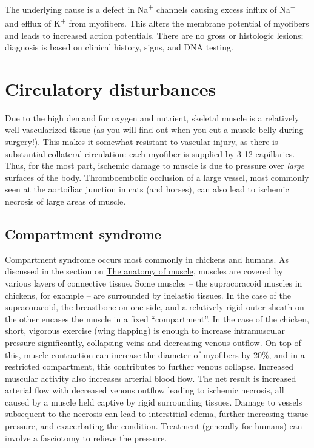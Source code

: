 \documentclass[openany]{book}
\begin{document}
The underlying cause is a defect in Na\textsuperscript{+} channels
causing excess influx of Na\textsuperscript{+} and efflux of
K\textsuperscript{+} from myofibers. This alters the membrane potential
of myofibers and leads to increased action potentials. There are no
gross or histologic lesions; diagnosis is based on clinical history,
signs, and DNA testing.

\chapter{Circulatory disturbances}\label{circulatory-disturbances}

Due to the high demand for oxygen and nutrient, skeletal muscle is a
relatively well vascularized tissue (as you will find out when you cut a
muscle belly during surgery!). This makes it somewhat resistant to
vascular injury, as there is substantial collateral circulation: each
myofiber is supplied by 3-12 capillaries. Thus, for the most part,
ischemic damage to muscle is due to pressure over \emph{large} surfaces
of the body. Thromboembolic occlusion of a large vessel, most commonly
seen at the aortoiliac junction in cats (and horses), can also lead to
ischemic necrosis of large areas of muscle.

\section{Compartment syndrome}\label{compartment-syndrome}

Compartment syndrome occurs most commonly in chickens and humans. As
discussed in the section on
\protect\hyperlink{the-anatomy-of-muscle}{The anatomy of muscle},
muscles are covered by various layers of connective tissue. Some muscles
-- the supracoracoid muscles in chickens, for example -- are surrounded
by inelastic tissues. In the case of the supracoracoid, the breastbone
on one side, and a relatively rigid outer sheath on the other encases
the muscle in a fixed ``compartment''. In the case of the chicken,
short, vigorous exercise (wing flapping) is enough to increase
intramuscular pressure significantly, collapsing veins and decreasing
venous outflow. On top of this, muscle contraction can increase the
diameter of myofibers by 20\%, and in a restricted compartment, this
contributes to further venous collapse. Increased muscular activity also
increases arterial blood flow. The net result is increased arterial flow
with decreased venous outflow leading to ischemic necrosis, all caused
by a muscle held captive by rigid surrounding tissues. Damage to vessels
subsequent to the necrosis can lead to interstitial edema, further
increasing tissue pressure, and exacerbating the condition. Treatment
(generally for humans) can involve a fasciotomy to relieve the pressure.
\end{document}
